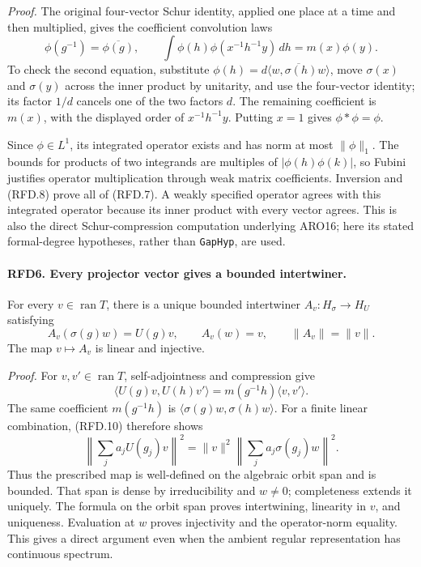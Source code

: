 \emph{Proof.}
The original four-vector Schur identity, applied one place at a
time and then multiplied, gives the coefficient convolution laws
\[
 \phi(g^{-1})=\overline{\phi(g)},\qquad
 \int\phi(h)\phi(x^{-1}h^{-1}y)\,dh=m(x)\phi(y).
 \tag{RFD.8}
\]
To check the second equation, substitute
\(\phi(h)=d\overline{\langle w,\sigma(h)w\rangle}\), move
\(\sigma(x)\) and \(\sigma(y)\) across the inner product by
unitarity, and use the four-vector identity; its factor \(1/d\)
cancels one of the two factors \(d\).  The remaining coefficient
is \(m(x)\), with the displayed order of \(x^{-1}h^{-1}y\).
Putting \(x=1\) gives \(\phi*\phi=\phi\).

Since \(\phi\in L^1\), its integrated operator exists and has
norm at most \(\|\phi\|_1\).  The bounds for products of two
integrands are multiples of \(|\phi(h)\phi(k)|\), so Fubini
justifies operator multiplication through weak matrix coefficients.
Inversion and (RFD.8) prove all of (RFD.7).  A weakly specified
operator agrees with this integrated operator because its inner
product with every vector agrees.  This is also the direct
Schur-compression computation underlying ARO16; here its stated
formal-degree hypotheses, rather than \texttt{GapHyp}, are used.

\paragraph{RFD6. Every projector vector gives a bounded intertwiner.}
\label{claim:RFD6}
For every \(v\in\operatorname{ran}T\), there is a unique bounded
intertwiner \(A_v:H_\sigma\to H_U\) satisfying
\[
 A_v(\sigma(g)w)=U(g)v,
 \qquad A_v(w)=v,
 \qquad \|A_v\|=\|v\|.
 \tag{RFD.9}
\]
The map \(v\mapsto A_v\) is linear and injective.

\emph{Proof.}
For \(v,v'\in\operatorname{ran}T\), self-adjointness and
compression give
\[
 \langle U(g)v,U(h)v'\rangle
   =m(g^{-1}h)\langle v,v'\rangle.
 \tag{RFD.10}
\]
The same coefficient \(m(g^{-1}h)\) is
\(\langle\sigma(g)w,\sigma(h)w\rangle\).
For a finite linear combination, (RFD.10) therefore shows
\[
 \left\|\sum_j a_jU(g_j)v\right\|^2
 =\|v\|^2\left\|\sum_j a_j\sigma(g_j)w\right\|^2.
 \tag{RFD.11}
\]
Thus the prescribed map is well-defined on the algebraic orbit
span and is bounded.  That span is dense by irreducibility and
\(w\ne0\); completeness extends it uniquely.  The formula on
the orbit span proves intertwining, linearity in \(v\), and
uniqueness.  Evaluation at \(w\) proves injectivity and the
operator-norm equality.  This gives a direct argument even when
the ambient regular representation has continuous spectrum.

